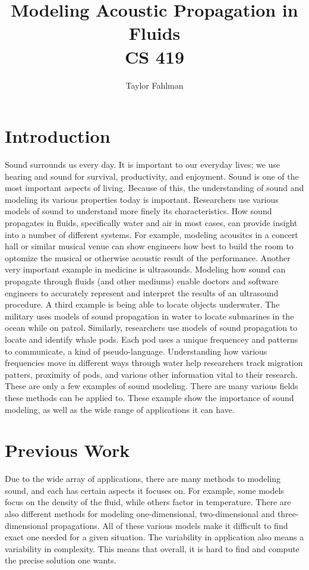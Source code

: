 \documentclass{article}
\begin{document}
\title{Modeling Acoustic Propagation in Fluids\\
CS 419}
\author{Taylor Fahlman}
\maketitle

\section{Introduction}

Sound surrounds us every day. It is important to our everyday lives; we use hearing and sound for survival,
productivity, and enjoyment. Sound is one of the most important aspects of living. Because of this, the 
understanding of sound and modeling its various properties today is important. Researchers use various
models of sound to understand more finely its characteristics. How sound propagates in fluids, specifically
water and air in most cases, can provide insight into a number of different systems. For example, modeling
acousitcs in a concert hall or similar musical venue can show engineers how best to build the room to
optomize the musical or otherwise acoustic result of the performance. Another very important example
in medicine is ultrasounds. Modeling how sound can propagate through fluids (and other mediums) enable
doctors and software engineers to accurately represent and interpret the results of an ultrasound
procedure. A third example is being able to locate objects underwater. The military uses models
of sound propagation in water to locate submarines in the ocean while on patrol. Similarly,
researchers use models of sound propagation to locate and identify whale pods. Each pod uses
a unique frequencey and patterns to communicate, a kind of pseudo-language. Understanding how
various frequencies move in different ways through water help researchers track migration patters,
proximity of pods, and various other information vital to their research. These are only a few
examples of sound modeling. There are many various fields these methods can be applied to. These
example show the importance of sound modeling, as well as the wide range of applications it can have.

\section{Previous Work}
Due to the wide array of applications, there are many methods to modeling sound, and each has certain
aspects it focuses on. For example, some models focus on the density of the fluid, while others factor
in temperature. There are also different methods for modeling one-dimensional, two-dimensional and
three-dimensional propagations. All of these various models make it difficult to find exact one needed
for a given situation. The variability in application also means a variability in complexity. This means
that overall, it is hard to find and compute the precise solution one wants. 
\end{document}
